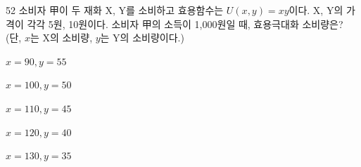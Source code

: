 \begin{question}{52}
소비자 甲이 두 재화 X, Y를 소비하고 효용함수는 $U(x,y)=xy$이다. X, Y의 가격이 각각 5원, 10원이다. 소비자 甲의 소득이 1,000원일 때, 효용극대화 소비량은? (단, $x$는 X의 소비량, $y$는 Y의 소비량이다.)
\begin{choices}
  \item $x=90,y=55$
  \item $x=100,y=50$
  \item $x=110,y=45$
  \item $x=120,y=40$
  \item $x=130,y=35$
\end{choices}
\end{question}
